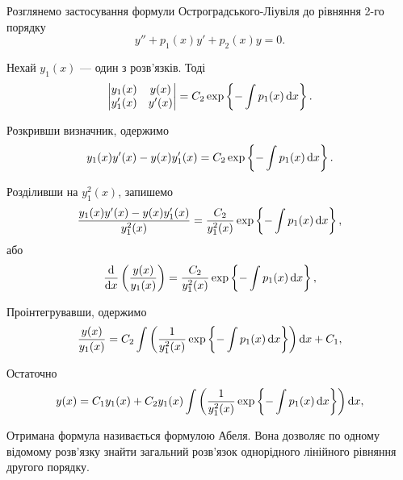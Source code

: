 Розглянемо застосування формули Остроградського-Ліувіля до рівняння 2-го порядку
\begin{equation*}
	y'' + p_1(x) y' + p_2(x) y = 0.
\end{equation*}

Нехай $y_1(x)$ --- один з розв'язків. Тоді
\begin{equation*}
	\begin{vmatrix}
		y_1(x) & y(x) \\
		y_1'(x) & y'(x)
	\end{vmatrix} = C_2 \exp \left\{ - \int p_1(x) \mathop{}\!\mathrm{d} x \right\}.
\end{equation*}

Розкривши визначник, одержимо
\begin{equation*}
	y_1(x) y'(x) - y(x) y_1'(x) = C_2 \exp \left\{ - \int p_1(x) \mathop{}\!\mathrm{d} x \right\}.
\end{equation*}
 
Розділивши на $y_1^2(x)$, запишемо
\begin{equation*}
	\frac{y_1(x) y'(x) - y(x) y_1'(x)}{y_1^2(x)} = \frac{C_2}{y_1^2(x)} \exp \left\{ - \int p_1(x) \mathop{}\!\mathrm{d} x \right\},
\end{equation*}
або
\begin{equation*}
	\frac{\mathop{}\!\mathrm{d}}{\mathop{}\!\mathrm{d} x} \left( \frac{y(x)}{y_1(x)} \right) = \frac{C_2}{y_1^2(x)} \exp \left\{ - \int p_1(x) \mathop{}\!\mathrm{d} x \right\},
\end{equation*}

Проінтегрувавши, одержимо
\begin{equation*}
	\frac{y(x)}{y_1(x)} = C_2 \int \left( \frac{1}{y_1^2(x)} \exp \left\{ - \int p_1(x) \mathop{}\!\mathrm{d} x \right\} \right) \mathop{}\!\mathrm{d} x + C_1,
\end{equation*}

Остаточно
\begin{equation*}
	y(x) = C_1 y_1(x) + C_2 y_1(x) \int \left( \frac{1}{y_1^2(x)} \exp \left\{ - \int p_1(x) \mathop{}\!\mathrm{d} x \right\} \right) \mathop{}\!\mathrm{d} x,
\end{equation*}

Отримана формула називається формулою Абеля. Вона дозволяє по одному відомому роз\-в'яз\-ку знайти загальний роз\-в'яз\-ок однорідного лінійного рівняння другого порядку.
